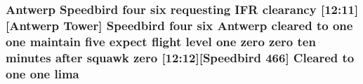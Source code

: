\subsubsection[{\texorpdfstring{lima}{lima}}]{\setlength{\rightskip}{0pt plus 5cm}Antwerp Speedbird four {\bf six} requesting I\+FR clearancy \mbox{[}12\+:11\mbox{]}\mbox{[}Antwerp {\bf Tower}\mbox{]} Speedbird four {\bf six} Antwerp cleared to {\bf one} {\bf one} maintain five expect flight level {\bf one} {\bf zero} {\bf zero} {\bf ten} minutes after squawk {\bf zero} \mbox{[}12\+:12\mbox{]}\mbox{[}Speedbird 466\mbox{]} Cleared to {\bf one} {\bf one} lima}\hypertarget{happyDay4ExpectedATC_8txt_abc10fad7597c191bcd8586b1cddb7835}{}\label{happyDay4ExpectedATC_8txt_abc10fad7597c191bcd8586b1cddb7835}
